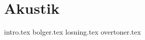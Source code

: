 \documentclass[crop=false, class=memoir]{standalone}
\begin{document}
\chapter{Akustik}
{intro.tex}
{bolger.tex}
{losning.tex}
{overtoner.tex}

\nocite{fletcherPhysicsMusicalInstruments1998}
\nocite{taylorClassicalMechanics2005}
\nocite{youngSearsZemanskyUniversity2016}
\end{document}
